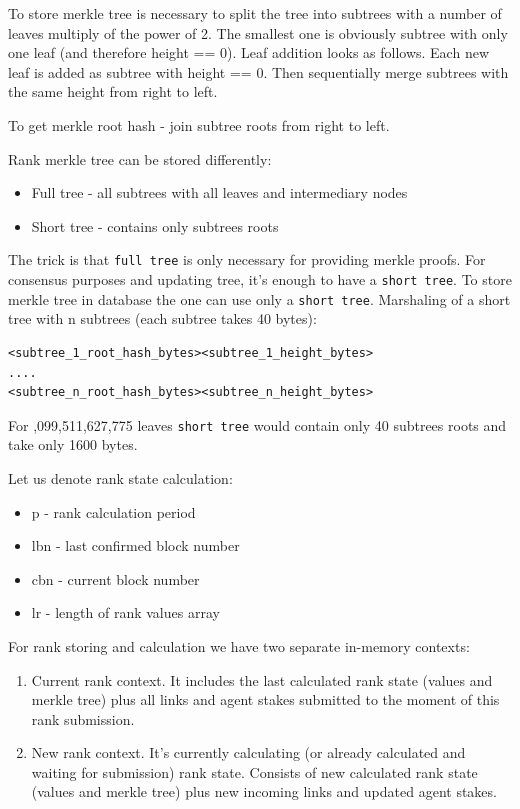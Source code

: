 \documentclass[8pt,oneside]{amsart}
\newcommand{\code}[1]{{\PlayBold #1}}
\begin{document}
To store merkle tree is necessary to split the tree into subtrees with a number of leaves multiply of the power of 2. The smallest one is obviously subtree with only one leaf (and therefore \code{height == 0}). Leaf addition looks as follows. Each new leaf is added as subtree with \code{height == 0}. Then sequentially merge subtrees with the same \code{height} from right to left.

To get merkle root hash - join subtree roots from right to left.

Rank merkle tree can be stored differently:

\begin{itemize}
\item[] Full tree - all subtrees with all leaves and intermediary nodes
\item[] Short tree - contains only subtrees roots
\end{itemize}

The trick is that \verb|full tree| is only necessary for providing merkle proofs. For consensus purposes and updating tree, it's enough to have a \verb|short tree|. To store merkle tree in database the one can use only a \verb|short tree|. Marshaling of a short tree with \code{n} subtrees (each subtree takes 40 bytes):

\begin{lstlisting}
<subtree_1_root_hash_bytes><subtree_1_height_bytes>
....
<subtree_n_root_hash_bytes><subtree_n_height_bytes>
\end{lstlisting}

For \code{1,099,511,627,775} leaves \verb|short tree| would contain only 40 subtrees roots and take only 1600 bytes.

Let us denote rank state calculation:

\begin{itemize}
    \item[] \code{p} - rank calculation period
    \item[] \code{lbn} - last confirmed block number
    \item[] \code{cbn} - current block number
    \item[] \code{lr} -  length of rank values array
\end{itemize}

For rank storing and calculation we have two separate in-memory contexts:

\begin{enumerate}
\item Current rank context. It includes the last calculated rank state (values and merkle tree) plus
all links and agent stakes submitted to the moment of this rank submission.
\item New rank context. It's currently calculating (or already calculated and waiting for submission) rank state. Consists of new calculated rank state (values and merkle tree) plus new incoming links and updated agent stakes.
\end{enumerate}
\end{document}
